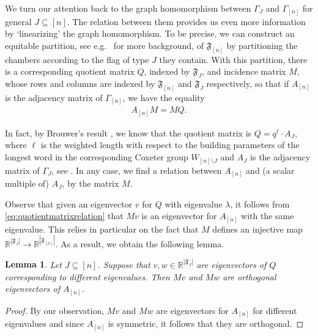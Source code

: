 \documentclass[11pt]{article}
\newtheorem{lemma}[thm]{Lemma}
\newcommand{\cF}{\mathfrak{F}}
\newcommand{\red}[1]{\textcolor{red}{#1}}
\newcommand{\philipp}[1]{\textcolor{blue}{#1}}
\begin{document}


We turn our attention back to the graph homomorphism between $\Gamma_J$ and $\Gamma_{[n]}$ for general $J \subseteq [n]$.
The relation between them provides us even more information by `linearizing' the graph homomorphism. To be precise, we can construct an equitable partition, see e.g.\  \cite[Section 2.2]{GodsilMeagher} for more background, of $\cF_{[n]}$ by partitioning the chambers according to the flag of type $J$ they contain. With this partition, there is a corresponding quotient matrix $Q$, indexed by $\cF_J$, and incidence matrix $M$, whose rows and columns are indexed by $\cF_{[n]}$ and $\cF_J$ respectively, so that if $A_{[n]}$ is the adjacency matrix of $\Gamma_{[n]}$, we have the equality
\begin{align}\label{eq:quotientmatrixrelation}
    A_{[n]}M = MQ.
\end{align}

In fact, by Brouwer's result \cite[Corollary 3.2]{brouwer_eigenvalues}, we know that the quotient matrix is $Q=q^\ell\cdot A_J$, where $\ell$ is the weighted length with respect to the building parameters of the longest word in the corresponding Coxeter group $W_{[n]\setminus J}$ and $A_J$ is the adjacency matrix of $\Gamma_J$, see . In any case, we find a relation between $A_{[n]}$ and (a scalar multiple of) $A_J$, by the matrix $M$. 

Observe that given an eigenvector $v$ for $Q$ with eigenvalue $\lambda$, it follows from \eqref{eq:quotientmatrixrelation} that $Mv$ is an eigenvector for $A_{[n]}$ with the same eigenvalue. This relies in particular on the fact that $M$ defines an injective map $\mathbb{R}^{|\cF_J|} \to \mathbb{R}^{|\cF_{[n]}|}$. As a result, we obtain the following lemma.

\begin{lemma}\label{lem:eigenvectorsthroughM}
    Let $J \subseteq [n]$. Suppose that $v,w \in \mathbb{R}^{|\cF_J|}$ are eigenvectors of $Q$ corresponding to different eigenvalues. Then $Mv$ and $Mw$ are orthogonal eigenvectors of $A_{[n]}$.
\end{lemma}
\begin{proof}
    By our observation, $Mv$ and $Mw$ are eigenvectors for $A_{[n]}$ for different eigenvalues and since $A_{[n]}$ is symmetric, it follows that they are orthogonal.
\end{proof}
\end{document}
